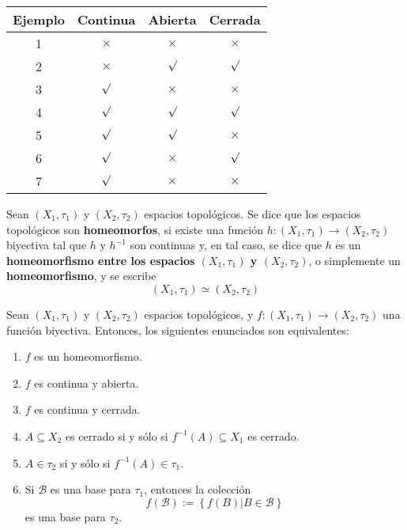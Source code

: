 \documentclass[12pt]{report}
\theoremstyle{largebreak}
\newcommand\cf[3]{\ensuremath{#1:#2\rightarrow#3}}
\begin{document}
    \begin{center}
        \begin{tabular}{c|c|c|c}
            Ejemplo & Continua & Abierta & Cerrada \\
            \hline
            1 & $\times$ & $\times$ & $\times$ \\
            2 & $\times$ & $\surd$ & $\surd$ \\
            3 & $\surd$ & $\times$ & $\times$ \\
            4 & $\surd$ & $\surd$ & $\surd$ \\
            5 & $\surd$ & $\surd$ & $\times$ \\
            6 & $\surd$ & $\times$ & $\surd$ \\
            7 & $\surd$ & $\times$ & $\times$ \\
        \end{tabular}
    \end{center}

    \begin{mydef}
        Sean $(X_1,\tau_1)$ y $(X_2,\tau_2)$ espacios topológicos. Se dice que los espacios topológicos son \textbf{homeomorfos}, si existe una función $\cf{h}{(X_1,\tau_1)}{(X_2,\tau_2)}$ biyectiva tal que $h$ y $h^{-1}$ son continuas y, en tal caso, se dice que $h$ es un \textbf{homeomorfismo entre los espacios $(X_1,\tau_1)$ y $(X_2,\tau_2)$}, o simplemente un \textbf{homeomorfismo}, y se escribe
        \begin{equation*}
            (X_1,\tau_1) \simeq (X_2,\tau_2)
        \end{equation*}
    \end{mydef}
    
    \begin{propo}
        Sean $(X_1,\tau_1)$ y $(X_2,\tau_2)$ espacios topológicos, y $\cf{f}{(X_1,\tau_1)}{(X_2,\tau_2)}$ una función biyectiva. Entonces, los siguientes enunciados son equivalentes:
        \begin{enumerate}
            \item $f$ es un homeomorfismo.
            \item $f$ es continua y abierta.
            \item $f$ es continua y cerrada.
            \item $A\subseteq X_2$ es cerrado si y sólo si $f^{-1}(A)\subseteq X_1$ es cerrado.
            \item $A\in\tau_2$ si y sólo si $f^{-1}(A)\in\tau_1$.
            \item Si $\mathcal{B}$ es una base para $\tau_1$, entonces la colección
            \begin{equation*}
                f(\mathcal{B}):=\left\{f(B)\Big|B\in\mathcal{B} \right\}
            \end{equation*}
            es una base para $\tau_2$.
        \end{enumerate}
    \end{propo}
\end{document}
